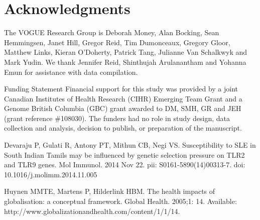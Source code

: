 \documentclass[10pt,letterpaper]{article}
\begin{document}
\section*{Acknowledgments}
The VOGUE Research Group is Deborah Money, Alan Bocking, Sean Hemmingsen, Janet Hill, Gregor Reid, Tim Dumonceaux, Gregory Gloor, Matthew Links, Kieran O'Doherty, Patrick Tang, Julianne Van Schalkwyk and Mark Yudin. We thank Jennifer Reid, Shinthujah Arulanantham and Yohanna Emun for assistance with data compilation.


Funding Statement
Financial support for this study was provided by a joint Canadian Institutes of Health Research (CIHR) Emerging Team Grant and a Genome British Columbia (GBC) grant awarded to DM, SMH, GR and JEH (grant reference \#108030). The funders had no role in study design, data collection and analysis, decision to publish, or preparation of the manuscript.

\nolinenumbers

%
%


\begin{thebibliography}{10}
Devaraju P, Gulati R, Antony PT, Mithun CB, Negi VS. Susceptibility to SLE in South Indian Tamils may be influenced by genetic selection pressure on TLR2 and TLR9 genes. Mol Immunol. 2014 Nov 22. pii: S0161-5890(14)00313-7. doi: 10.1016/j.molimm.2014.11.005

Huynen MMTE, Martens P, Hilderlink HBM. The health impacts of globalisation: a conceptual framework. Global Health. 2005;1: 14. Available: http://www.globalizationandhealth.com/content/1/1/14.

\end{thebibliography}
\end{document}
